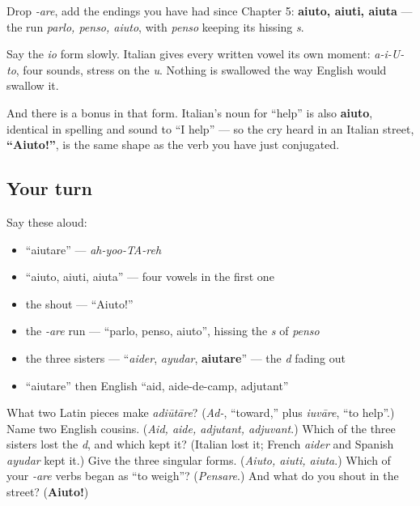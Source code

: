 \begin{grammarlens}[title={Grammar Lens: the -are endings, and the shout}]
Drop \emph{-are}, add the endings you have had since Chapter 5: \textbf{aiuto, aiuti, aiuta} — the run \emph{parlo, penso, aiuto}, with \emph{penso} keeping its hissing \emph{s}.

Say the \emph{io} form slowly. Italian gives every written vowel its own moment: \emph{a-i-U-to}, four sounds, stress on the \emph{u}. Nothing is swallowed the way English would swallow it.

And there is a bonus in that form. Italian's noun for \textquotedblleft{}help\textquotedblright{} is also \textbf{aiuto}, identical in spelling and sound to \textquotedblleft{}I help\textquotedblright{} — so the cry heard in an Italian street, \textbf{\textquotedblleft{}Aiuto!\textquotedblright{}}, is the same shape as the verb you have just conjugated.
\end{grammarlens}

\subsection*{Your turn}
Say these aloud:

\begin{itemize}
\raggedright
  \item \textquotedblleft{}aiutare\textquotedblright{} — \emph{ah-yoo-TA-reh}
  \item \textquotedblleft{}aiuto, aiuti, aiuta\textquotedblright{} — four vowels in the first one
  \item the shout — \textquotedblleft{}Aiuto!\textquotedblright{}
  \item the \emph{-are} run — \textquotedblleft{}parlo, penso, aiuto\textquotedblright{}, hissing the \emph{s} of \emph{penso}
  \item the three sisters — \textquotedblleft{}\emph{aider}, \emph{ayudar}, \textbf{aiutare}\textquotedblright{} — the \emph{d} fading out
  \item \textquotedblleft{}aiutare\textquotedblright{} then English \textquotedblleft{}aid, aide-de-camp, adjutant\textquotedblright{}
\end{itemize}

\begin{tcolorbox}[breakable,colback=teal!4,colframe=teal!35!black,title={Before you move on}]
What two Latin pieces make \emph{adiūtāre}? (\emph{Ad-}, \textquotedblleft{}toward,\textquotedblright{} plus \emph{iuvāre}, \textquotedblleft{}to help\textquotedblright{}.) Name two English cousins. (\emph{Aid, aide, adjutant, adjuvant}.) Which of the three sisters lost the \emph{d}, and which kept it? (Italian lost it; French \emph{aider} and Spanish \emph{ayudar} kept it.) Give the three singular forms. (\emph{Aiuto, aiuti, aiuta}.) Which of your \emph{-are} verbs began as \textquotedblleft{}to weigh\textquotedblright{}? (\emph{Pensare}.) And what do you shout in the street? (\textbf{Aiuto!})
\end{tcolorbox}

